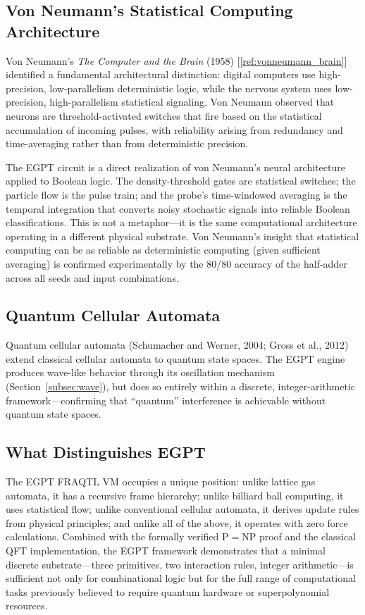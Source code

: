 \documentclass[11pt,a4paper]{article}
\begin{document}
\subsection{Von Neumann's Statistical Computing Architecture}

Von Neumann's \emph{The Computer and the Brain} (1958) [\ref{ref:vonneumann_brain}] identified a fundamental architectural distinction: digital computers use high-precision, low-parallelism deterministic logic, while the nervous system uses low-precision, high-parallelism statistical signaling. Von Neumann observed that neurons are threshold-activated switches that fire based on the statistical accumulation of incoming pulses, with reliability arising from redundancy and time-averaging rather than from deterministic precision.

The EGPT circuit is a direct realization of von Neumann's neural architecture applied to Boolean logic. The density-threshold gates are statistical switches; the particle flow is the pulse train; and the probe's time-windowed averaging is the temporal integration that converts noisy stochastic signals into reliable Boolean classifications. This is not a metaphor---it is the same computational architecture operating in a different physical substrate. Von Neumann's insight that statistical computing can be as reliable as deterministic computing (given sufficient averaging) is confirmed experimentally by the 80/80 accuracy of the half-adder across all seeds and input combinations.

\subsection{Quantum Cellular Automata}

Quantum cellular automata (Schumacher and Werner, 2004; Gross et al., 2012) extend classical cellular automata to quantum state spaces. The EGPT engine produces wave-like behavior through its oscillation mechanism (Section~\ref{subsec:wave}), but does so entirely within a discrete, integer-arithmetic framework---confirming that ``quantum'' interference is achievable without quantum state spaces.

\subsection{What Distinguishes EGPT}

The EGPT FRAQTL VM occupies a unique position: unlike lattice gas automata, it has a recursive frame hierarchy; unlike billiard ball computing, it uses statistical flow; unlike conventional cellular automata, it derives update rules from physical principles; and unlike all of the above, it operates with zero force calculations. Combined with the formally verified $\mathrm{P} = \mathrm{NP}$ proof and the classical QFT implementation, the EGPT framework demonstrates that a minimal discrete substrate---three primitives, two interaction rules, integer arithmetic---is sufficient not only for combinational logic but for the full range of computational tasks previously believed to require quantum hardware or superpolynomial resources.
\end{document}
